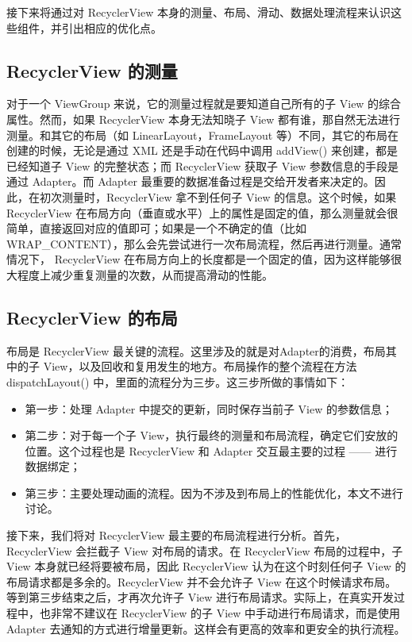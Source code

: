 接下来将通过对 RecyclerView 本身的测量、布局、滑动、数据处理流程来认识这些组件，并引出相应的优化点。

\subsection{RecyclerView 的测量}

对于一个 ViewGroup 来说，它的测量过程就是要知道自己所有的子 View 的综合属性。然而，如果 RecyclerView 本身无法知晓子 View 都有谁，那自然无法进行测量。和其它的布局（如 LinearLayout，FrameLayout 等）不同，其它的布局在创建的时候，无论是通过 XML 还是手动在代码中调用 addView() 来创建，都是已经知道子 View 的完整状态；而 RecyclerView 获取子 View 参数信息的手段是通过 Adapter。而 Adapter 最重要的数据准备过程是交给开发者来决定的。因此，在初次测量时，RecyclerView 拿不到任何子 View 的信息。这个时候，如果RecyclerView 在布局方向（垂直或水平）上的属性是固定的值，那么测量就会很简单，直接返回对应的值即可；如果是一个不确定的值（比如 WRAP\_CONTENT），那么会先尝试进行一次布局流程，然后再进行测量。通常情况下， RecyclerView 在布局方向上的长度都是一个固定的值，因为这样能够很大程度上减少重复测量的次数，从而提高滑动的性能。

\subsection{RecyclerView 的布局}

布局是 RecyclerView 最关键的流程。这里涉及的就是对Adapter的消费，布局其中的子 View，以及回收和复用发生的地方。布局操作的整个流程在方法 dispatchLayout() 中，里面的流程分为三步。这三步所做的事情如下：

\begin{itemize}
    \item 第一步：处理 Adapter 中提交的更新，同时保存当前子 View 的参数信息；
    \item 第二步：对于每一个子 View，执行最终的测量和布局流程，确定它们安放的位置。这个过程也是 RecyclerView 和 Adapter 交互最主要的过程 —— 进行数据绑定；
    \item 第三步：主要处理动画的流程。因为不涉及到布局上的性能优化，本文不进行讨论。
\end{itemize}

接下来，我们将对 RecyclerView 最主要的布局流程进行分析。首先，RecyclerView 会拦截子 View 对布局的请求。在 RecyclerView 布局的过程中，子 View 本身就已经将要被布局，因此 RecyclerView 认为在这个时刻任何子 View 的布局请求都是多余的。RecyclerView 并不会允许子 View 在这个时候请求布局。等到第三步结束之后，才再次允许子 View 进行布局请求。实际上，在真实开发过程中，也非常不建议在 RecyclerView 的子 View 中手动进行布局请求，而是使用 Adapter 去通知的方式进行增量更新。这样会有更高的效率和更安全的执行流程。

